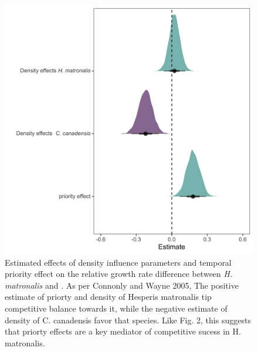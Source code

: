 \documentclass{article}\usepackage[]{graphicx}\usepackage[]{color}
\begin{document}
\begin{figure}[h!]
    \centering
\includegraphics[width=\textwidth]{..//figure/mu_plots.jpeg}
    \caption{Estimated effects of density influence parameters and temporal priority effect on the relative growth rate difference between \textit{H. matronalis} and . As per Connonly and Wayne 2005, The positive estimate of priorty and density of Hesperis matronalis tip competitive balance towards it, while the negative estimate of density of C. canadensis favor that species. Like Fig. 2, this suggests that priorty effects are a key mediator of competitive sucess in H. matronalis.  } 
    \label{fig:RGRD}
\end{figure}
\end{document}
